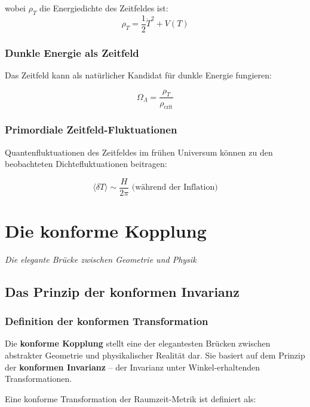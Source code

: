 \documentclass[12pt,a4paper]{report}
\begin{document}
	wobei $\rho_T$ die Energiedichte des Zeitfeldes ist:
	\begin{equation}
		\rho_T = \frac{1}{2}\dot{T}^2 + V(T)
	\end{equation}
	
	\subsection{Dunkle Energie als Zeitfeld}
	
	Das Zeitfeld kann als natürlicher Kandidat für dunkle Energie fungieren:
	
	\begin{equation}
		\Omega_{\Lambda} = \frac{\rho_T}{\rho_{\text{crit}}}
	\end{equation}
	
	\subsection{Primordiale Zeitfeld-Fluktuationen}
	
	Quantenfluktuationen des Zeitfeldes im frühen Universum können zu den beobachteten Dichtefluktuationen beitragen:
	
	\begin{equation}
		\langle\delta T\rangle \sim \frac{H}{2\pi} \text{ (während der Inflation)}
	\end{equation}
	
	\chapter{Die konforme Kopplung}
	\textit{Die elegante Brücke zwischen Geometrie und Physik}
	
	\section{Das Prinzip der konformen Invarianz}
	
	\subsection{Definition der konformen Transformation}
	
	Die \textbf{konforme Kopplung} stellt eine der elegantesten Brücken zwischen abstrakter Geometrie und physikalischer Realität dar. Sie basiert auf dem Prinzip der \textbf{konformen Invarianz} -- der Invarianz unter Winkel-erhaltenden Transformationen.
	
	Eine konforme Transformation der Raumzeit-Metrik ist definiert als:
	
\end{document}
